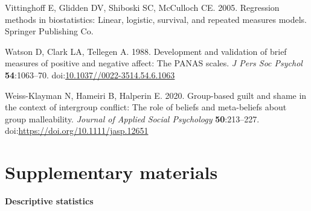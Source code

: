 \documentclass[
]{article}
\newlength{\cslhangindent}
\newenvironment{CSLReferences}[2] %
 {\begin{list}{}{%
  \setlength{\itemindent}{0pt}
  \setlength{\leftmargin}{0pt}
  \setlength{\parsep}{0pt}
  \ifodd #1
   \setlength{\leftmargin}{\cslhangindent}
   \setlength{\itemindent}{-1\cslhangindent}
  \fi
  \setlength{\itemsep}{#2\baselineskip}}}
 {\end{list}}
\newcommand{\beginsupplement}{\setcounter{table}{0}
\renewcommand{\thetable}{S\arabic{table}}
\setcounter{figure}{0}
\renewcommand{\thefigure}{S\arabic{figure}}}
\begin{document}
\begin{CSLReferences}{1}{0}
Vittinghoff E, Glidden DV, Shiboski SC, McCulloch CE. 2005. Regression methods in biostatistics: Linear, logistic, survival, and repeated measures models. Springer Publishing Co.

Watson D, Clark LA, Tellegen A. 1988. Development and validation of brief measures of positive and negative affect: The PANAS scales. \emph{J Pers Soc Psychol} \textbf{54}:1063--70. doi:\href{https://doi.org/10.1037//0022-3514.54.6.1063}{10.1037//0022-3514.54.6.1063}

Weiss-Klayman N, Hameiri B, Halperin E. 2020. Group-based guilt and shame in the context of intergroup conflict: The role of beliefs and meta-beliefs about group malleability. \emph{Journal of Applied Social Psychology} \textbf{50}:213--227. doi:\url{https://doi.org/10.1111/jasp.12651}

\end{CSLReferences}

\section*{Supplementary materials}\label{supplementary-materials}

\beginsupplement

\textbf{Descriptive statistics}
\end{document}
